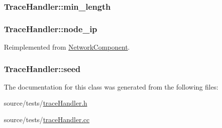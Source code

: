 \hypertarget{classTraceHandler_621a0abf23e7fd289a1285c65ff86a39}{
\subsubsection[{min\_\-length}]{ {\bf TraceHandler::min\_\-length}}}
\label{classTraceHandler_621a0abf23e7fd289a1285c65ff86a39}


\hypertarget{classTraceHandler_b54df7fbf5273b6132975f3e5bf26057}{
\subsubsection[{node\_\-ip}]{ {\bf TraceHandler::node\_\-ip}}}
\label{classTraceHandler_b54df7fbf5273b6132975f3e5bf26057}




Reimplemented from \hyperlink{classNetworkComponent_56599b3484333fb78af1b6c33f77cf16}{NetworkComponent}.\hypertarget{classTraceHandler_5a0af043673b7c8e6c17e965420c8a64}{
\subsubsection[{seed}]{ {\bf TraceHandler::seed}}}
\label{classTraceHandler_5a0af043673b7c8e6c17e965420c8a64}




The documentation for this class was generated from the following files:\begin{CompactItemize}
\item 
source/tests/\hyperlink{traceHandler_8h}{traceHandler.h}\item 
source/tests/\hyperlink{traceHandler_8cc}{traceHandler.cc}\end{CompactItemize}
